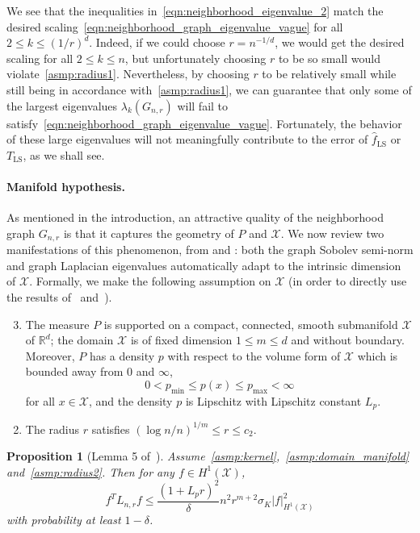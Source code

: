 \documentclass[twoside]{article}
\newcommand{\Reals}{\mathbb{R}}
\newcommand{\1}{\mathbf{1}}
\newcommand{\Lap}{L}
\newcommand{\Xset}{\mathcal{X}}
\newcommand{\wh}[1]{\widehat{#1}}
\newcommand{\LS}{\mathrm{LS}}
\newtheorem{proposition}{Proposition}
\theoremstyle{definition}
\theoremstyle{remark}
\begin{document}
We see that the inequalities in~\eqref{eqn:neighborhood_eigenvalue_2} match the desired scaling~\eqref{eqn:neighborhood_graph_eigenvalue_vague} for all $2 \leq k \leq (1/r)^d$. Indeed, if we could choose $r = n^{-1/d}$, we would get the desired scaling for all $2 \leq k \leq n$, but unfortunately choosing $r$ to be so small would violate~\ref{asmp:radius1}. Nevertheless, by choosing $r$ to be relatively small while still being in accordance with~\ref{asmp:radius1}, we can guarantee that only some of the largest eigenvalues $\lambda_k(G_{n,r})$ will fail to satisfy~\eqref{eqn:neighborhood_graph_eigenvalue_vague}. Fortunately, the behavior of these large eigenvalues will not meaningfully contribute to the error of $\wh{f}_{\LS}$ or $T_{\LS}$, as we shall see.

\paragraph{Manifold hypothesis.}

As mentioned in the introduction, an attractive quality of the neighborhood graph $G_{n,r}$ is that it captures the geometry of $P$ and $\Xset$. We now review two manifestations of this phenomenon, from \cite{trillos2019} and \cite{calder2019}: both the graph Sobolev semi-norm and graph Laplacian eigenvalues automatically adapt to the intrinsic dimension of $\Xset$. Formally, we make the following assumption on $\Xset$ (in order to directly use the results of~\cite{trillos2019} and~\cite{calder2019}).
\begin{enumerate}[label=(P\arabic*)]
	\setcounter{enumi}{2}
	\item 
	\label{asmp:domain_manifold}
	The measure $P$ is supported on a compact, connected, smooth submanifold $\Xset$ of $\Reals^d$; the domain $\Xset$ is of fixed dimension $1 \leq m \leq d$ and without boundary. Moreover, $P$ has a density $p$ with respect to the volume form of $\Xset$ which is bounded away from $0$ and $\infty$,
	\begin{equation*}
	0 < p_{\min} \leq p(x) \leq p_{\max} < \infty
	\end{equation*}
	for all $x \in \Xset$, and the density $p$ is Lipschitz with Lipschitz constant $L_p$.
\end{enumerate}
\begin{enumerate}[label=(R\arabic*)]
	\setcounter{enumi}{1}
	\item 
	\label{asmp:radius2}
	The radius $r$ satisfies $(\log n/n)^{1/m} \leq r \leq c_2$.
\end{enumerate}
\begin{proposition}[Lemma 5 of~\cite{trillos2019}]
	\label{prop:manifold_graph_sobolev_seminorm}
	Assume~\ref{asmp:kernel},~\ref{asmp:domain_manifold} and~\ref{asmp:radius2}. Then for any $f \in H^1(\Xset)$,
	\begin{equation*}
	f^T \Lap_{n,r} f \leq \frac{(1 + L_pr)^2}{\delta}n^{2}r^{m + 2} \sigma_K |f|_{H^1(\Xset)}^2
	\end{equation*}
	with probability at least $1 - \delta$.
\end{proposition}
\end{document}
